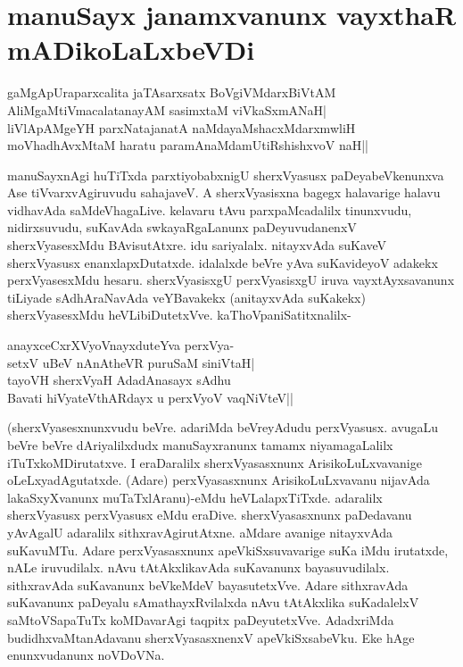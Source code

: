 \chapter{manuSayx janamxvanunx vayxthaR mADikoLaLxbeVDi}\label{chap6}

\begin{shloka}
gaMgApUraparxcalita jaTAsarxsatx BoVgiVMdarxBiVtAM\\
AliMgaMtiVmacalatanayAM sasimxtaM viVkaSxmANaH|\\
liVlApAMgeYH parxNatajanatA naMdayaMshacxMdarxmwliH\\
moVhadhAvxMtaM haratu paramAnaMdamUtiRshishxvoV naH||
\end{shloka}

manuSayxnAgi huTiTxda parxtiyobabxnigU sherxVyasusx paDeyabeVkenunxva Ase tiVvarxvAgiruvudu sahajaveV. A sherxVyasisxna bagegx halavarige halavu vidhavAda saMdeVhagaLive. kelavaru tAvu parxpaMcadalilx tinunxvudu, nidirxsuvudu, suKavAda swkayaRgaLanunx paDeyuvudanenxV sherxVyasesxMdu BAvisutAtxre. idu sariyalalx. nitayxvAda suKaveV sherxVyasusx enanxlapxDutatxde. idalalxde beVre yAva suKavideyoV adakekx perxVyasesxMdu hesaru. sherxVyasisxgU perxVyasisxgU iruva vayxtAyxsavanunx tiLiyade sAdhAraNavAda veYBavakekx (anitayxvAda suKakekx) sherxVyasesxMdu heVLibiDutetxVve. kaThoVpaniSatitxnalilx-

\begin{shloka}
anayxceCxrXVyoV\s nayxduteYva perxVya-\\
setxV uBeV nAnAtheVR puruSaM siniVtaH|\\
tayoVH sherxVyaH AdadAnasayx sAdhu\\
Bavati hiVyateV\s thARdayx u perxVyoV vaqNiVteV||
\end{shloka}

(sherxVyasesxnunxvudu beVre. adariMda beVreyAdudu perxVyasusx. avugaLu beVre beVre dAriyalilxdudx manuSayxranunx tamamx niyamagaLalilx iTuTxkoMDirutatxve. I eraDaralilx sherxVyasasxnunx ArisikoLuLxvavanige oLeLxyadAgutatxde. (Adare) perxVyasasxnunx ArisikoLuLxvavanu nijavAda lakaSxyXvanunx muTaTxlAranu)-eMdu heVLalapxTiTxde. adaralilx sherxVyasusx perxVyasusx eMdu eraDive. sherxVyasasxnunx paDedavanu yAvAgalU adaralilx sithxravAgirutAtxne. aMdare avanige nitayxvAda suKavuMTu. Adare perxVyasasxnunx apeVkiSxsuvavarige suKa iMdu irutatxde, nALe iruvudilalx. nAvu tAtAkxlikavAda suKavanunx bayasuvudilalx. sithxravAda suKavanunx beVkeMdeV bayasutetxVve. Adare sithxravAda suKavanunx paDeyalu sAmathayxRvilalxda nAvu tAtAkxlika suKadalelxV saMtoVSapaTuTx koMDavarAgi taqpitx paDeyutetxVve. AdadxriMda budidhxvaMtanAdavanu sherxVyasasxnenxV apeVkiSxsabeVku. Eke hAge enunxvudanunx noVDoVNa.

